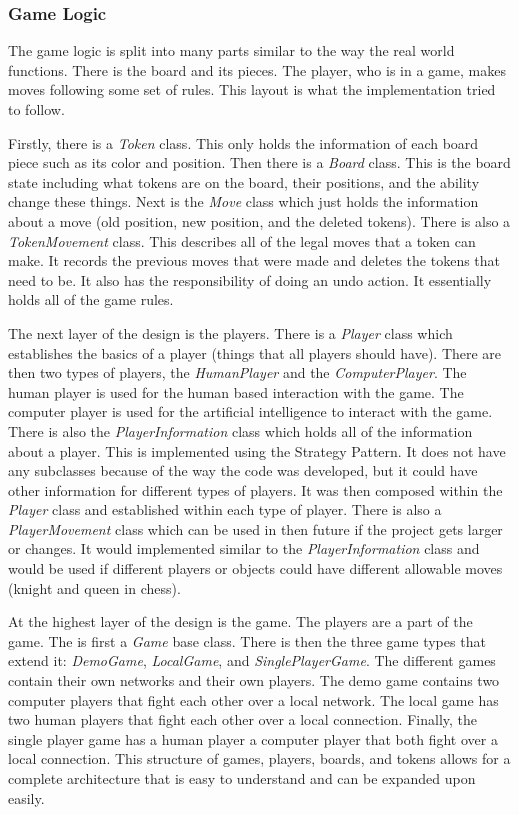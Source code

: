 \documentclass{article}
\begin{document}
\subsubsection{Game Logic}
	The game logic is split into many parts similar to the way the real world functions. There is the board and its pieces. The player, who is in a game, makes moves following some set of rules. This layout is what the implementation tried to follow.\par
	Firstly, there is a \textit{Token} class. This only holds the information of each board piece such as its color and position. Then there is a \textit{Board} class. This is the board state including what tokens are on the board, their positions, and the ability change these things. Next is the \textit{Move} class which just holds the information about a move (old position, new position, and the deleted tokens). There is also a \textit{TokenMovement} class. This describes all of the legal moves that a token can make. It records the previous moves that were made and deletes the tokens that need to be. It also has the responsibility of doing an undo action. It essentially holds all of the game rules. \par
	The next layer of the design is the players. There is a \textit{Player} class which establishes the basics of a player (things that all players should have). There are then two types of players, the \textit{HumanPlayer} and the \textit{ComputerPlayer}. The human player is used for the human based interaction with the game. The computer player is used for the artificial intelligence to interact with the game. There is also the \textit{PlayerInformation} class which holds all of the information about a player. This is implemented using the Strategy Pattern. It does not have any subclasses because of the way the code was developed, but it could have other information for different types of players. It was then composed within the \textit{Player} class and established within each type of player. There is also a \textit{PlayerMovement} class which can be used in then future if the project gets larger or changes. It would implemented similar to the \textit{PlayerInformation} class and would be used if different players or objects could have different allowable moves (knight and queen in chess).\par
	At the highest layer of the design is the game. The players are a part of the game. The is first a \textit{Game} base class. There is then the three game types that extend it: \textit{DemoGame}, \textit{LocalGame}, and \textit{SinglePlayerGame}. The different games contain their own networks and their own players. The demo game contains two computer players that fight each other over a local network. The local game has two human players that fight each other over a local connection. Finally, the single player game has a human player a computer player that both fight over a local connection. This structure of games, players, boards, and tokens allows for a complete architecture that is easy to understand and can be expanded upon easily. 
\end{document}
